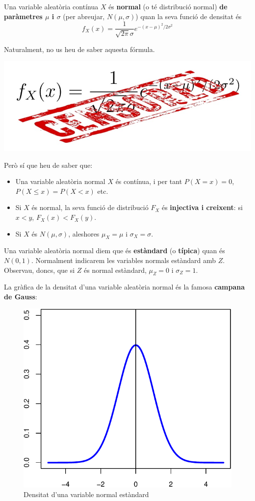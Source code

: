 \documentclass[
]{book}
\renewcommand{\leq}{\leqslant}
\theoremstyle{definition}
\theoremstyle{definition}
\theoremstyle{definition}
\theoremstyle{remark}
\begin{document}
Una variable aleatòria contínua \(X\) és \textbf{normal} (o té distribució normal) \textbf{de paràmetres \(\mu\) i \(\sigma\)} (per abreujar, \(N(\mu,\sigma)\)) quan la seva funció de densitat és
\[
f_{X}(x)=\frac{1}{\sqrt{2\pi}\sigma} e^{{-(x-\mu)^2}/{2\sigma^{2}}}
\]

Naturalment, no us heu de saber aquesta fórmula.

\begin{center}\includegraphics[width=0.35\linewidth]{Bioestadistica-II_files/figure-html/censored} \end{center}

Però sí que heu de saber que:

\begin{itemize}
\item
  Una variable aleatòria normal \(X\) és contínua, i per tant \(P(X=x)=0\), \(P(X\leq x)=P(X<x)\) etc.
\item
  Si \(X\) és normal, la seva funció de distribució \(F_X\) és \textbf{injectiva i creixent}: si \(x<y\), \(F_X(x)<F_X(y)\).
\item
  Si \(X\) és \(N(\mu,\sigma)\), aleshores \(\mu_X=\mu\) i \(\sigma_X=\sigma\).
\end{itemize}

Una variable aleatòria normal diem que és \textbf{estàndard} (o \textbf{típica}) quan és \(N(0,1)\). Normalment indicarem les variables normals estàndard amb \(Z\). Observau, doncs, que si \(Z\) és normal estàndard, \(\mu_Z=0\) i \(\sigma_Z=1\).

La gràfica de la densitat d'una variable aleatòria normal és la famosa \textbf{campana de Gauss}:

\begin{figure}

{\centering \includegraphics[width=0.5\linewidth]{Bioestadistica-II_files/figure-latex/unnamed-chunk-66-1} 

}

\caption{Densitat d'una variable normal estàndard}\label{fig:unnamed-chunk-66}
\end{figure}
\end{document}
